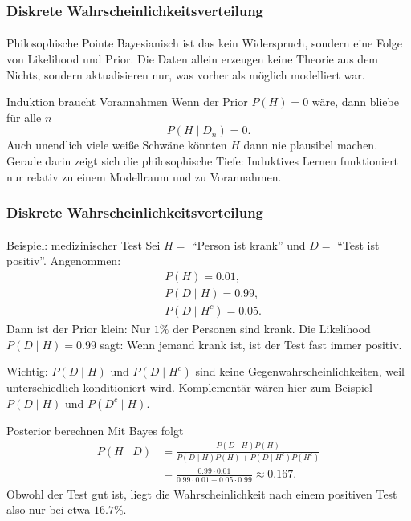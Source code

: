 \documentclass{beamer}
\begin{document}
\begin{frame}
    \frametitle{Diskrete Wahrscheinlichkeitsverteilung}
\framesubtitle{}

\begin{block}{Philosophische Pointe}
Bayesianisch ist das kein Widerspruch, sondern eine Folge von Likelihood und Prior.
Die Daten allein erzeugen keine Theorie aus dem Nichts, sondern aktualisieren nur, was vorher als möglich modelliert war.
\end{block}

\begin{block}{Induktion braucht Vorannahmen}
Wenn der Prior \(P(H)=0\) wäre, dann bliebe für alle \(n\)
\[
P(H \mid D_n)=0.
\]
Auch unendlich viele weiße Schwäne könnten \(H\) dann nie plausibel machen.
Gerade darin zeigt sich die philosophische Tiefe: Induktives Lernen funktioniert nur relativ zu einem Modellraum und zu Vorannahmen.
\end{block}

 \end{frame}


\begin{frame}[shrink=5]
    \frametitle{Diskrete Wahrscheinlichkeitsverteilung}
\framesubtitle{}

\begin{block}{Beispiel: medizinischer Test}
Sei $H=$ ``Person ist krank'' und $D=$ ``Test ist positiv''.
Angenommen:
\begin{align*}
&P(H)=0.01, \\
&P(D \mid H)=0.99, \\
&P(D \mid H^c)=0.05.
\end{align*}
Dann ist der Prior klein: Nur $1\%$ der Personen sind krank. Die Likelihood $P(D \mid H)=0.99$ sagt: Wenn jemand krank ist, ist der Test fast immer positiv.

Wichtig: $P(D \mid H)$ und $P(D \mid H^c)$ sind keine Gegenwahrscheinlichkeiten, weil unterschiedlich konditioniert wird. Komplementär wären hier zum Beispiel $P(D \mid H)$ und $P(D^c \mid H)$.
\end{block}

\begin{block}{Posterior berechnen}
Mit Bayes folgt
\begin{align*}
P(H \mid D)
&= \frac{P(D \mid H)P(H)}{P(D \mid H)P(H) + P(D \mid H^c)P(H^c)} \\
&= \frac{0.99 \cdot 0.01}{0.99 \cdot 0.01 + 0.05 \cdot 0.99}
\approx 0.167.
\end{align*}
Obwohl der Test gut ist, liegt die Wahrscheinlichkeit nach einem positiven Test also nur bei etwa $16.7\%$.
\end{block}

 \end{frame}
\end{document}
